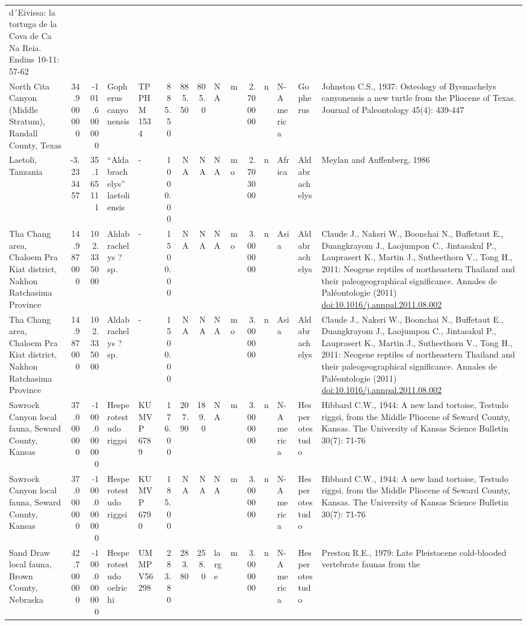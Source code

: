 \documentclass[]{article}
\begin{document}
\begin{longtable}[]{@{}lrrllrrrllrllll@{}}
d´Eivissa: la tortuga de la Cova de Ca Na Reia. Endins 10-11:
57-62\tabularnewline
North Cita Canyon (Middle Stratum), Randall County, Texas & 34.900000 &
-101.600000 & Gopherus canyonensis & TPPHM 1534 & 885.50 & 885.50 &
805.0 & NA & m & 2.700000 & n & N-America & Gopherus & Johnston C.S.,
1937: Osteology of Bysmachelys canyonensis a new turtle from the
Pliocene of Texas. Journal of Paleontology 45(4): 439-447\tabularnewline
Laetoli, Tanzania & -3.233457 & 35.165111 & ``Aldabrachelys''
laetoliensis & - & 1000.00 & NA & NA & NA & mo & 2.703000 & n & Africa &
Aldabrachelys & Meylan and Auffenberg, 1986\tabularnewline
Tha Chang area, Chaloem Pra Kiat district, Nakhon Ratchasima Province &
14.987000 & 102.335000 & Aldabrachelys ? sp. & - & 1500.00 & NA & NA &
NA & mo & 3.000000 & n & Asia & Aldabrachelys & Claude J., Naksri W.,
Boonchai N., Buffetaut E., Duangkrayom J., Laojumpon C., Jintasakul P.,
Lauprasert K., Martin J., Sutheethorn V., Tong H., 2011: Neogene
reptiles of northeastern Thailand and their paleogeographical
significance. Annales de Paléontologie (2011)
\url{doi:10.1016/j.annpal.2011.08.002}\tabularnewline
Tha Chang area, Chaloem Pra Kiat district, Nakhon Ratchasima Province &
14.987000 & 102.335000 & Aldabrachelys ? sp. & - & 1500.00 & NA & NA &
NA & mo & 3.000000 & n & Asia & Aldabrachelys & Claude J., Naksri W.,
Boonchai N., Buffetaut E., Duangkrayom J., Laojumpon C., Jintasakul P.,
Lauprasert K., Martin J., Sutheethorn V., Tong H., 2011: Neogene
reptiles of northeastern Thailand and their paleogeographical
significance. Annales de Paléontologie (2011)
\url{doi:10.1016/j.annpal.2011.08.002}\tabularnewline
Sawrock Canyon local fauna, Seward County, Kansas & 37.000000 &
-100.000000 & Hesperotestudo riggsi & KUMVP 6789 & 176.00 & 207.90 &
189.0 & NA & m & 3.000000 & n & N-America & Hesperotestudo & Hibbard
C.W., 1944: A new land tortoise, Testudo riggsi, from the Middle
Pliocene of Seward County, Kansas. The University of Kansas Science
Bulletin 30(7): 71-76\tabularnewline
Sawrock Canyon local fauna, Seward County, Kansas & 37.000000 &
-100.000000 & Hesperotestudo riggsi & KUMVP 6790 & 185.00 & NA & NA & NA
& m & 3.000000 & n & N-America & Hesperotestudo & Hibbard C.W., 1944: A
new land tortoise, Testudo riggsi, from the Middle Pliocene of Seward
County, Kansas. The University of Kansas Science Bulletin 30(7):
71-76\tabularnewline
Sand Draw local fauna, Brown County, Nebraska & 42.700000 & -100.000000
& Hesperotestudo oelrichi & UMMP V56298 & 283.80 & 283.80 & 258.0 &
large & m & 3.000000 & n & N-America & Hesperotestudo & Preston R.E.,
1979: Late Pleistocene cold-blooded vertebrate faunas from the

\end{longtable}
\end{document}
